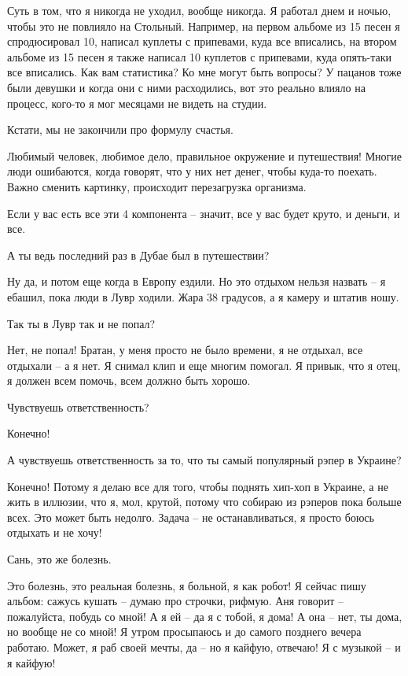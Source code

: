 Суть в том, что я никогда не уходил, вообще никогда. Я работал днем и ночью,
чтобы это не повлияло на Стольный. Например, на первом альбоме из 15 песен я
спродюсировал 10, написал куплеты с припевами, куда все вписались, на втором
альбоме из 15 песен я также написал 10 куплетов с припевами, куда опять-таки
все вписались. Как вам статистика? Ко мне могут быть вопросы? У пацанов тоже
были девушки и когда они с ними расходились, вот это реально влияло на процесс,
кого-то я мог месяцами не видеть на студии.

Кстати, мы не закончили про формулу счастья.

Любимый человек, любимое дело, правильное окружение и путешествия! Многие люди
ошибаются, когда говорят, что у них нет денег, чтобы куда-то поехать. Важно
сменить картинку, происходит перезагрузка организма.

Если у вас есть все эти 4 компонента – значит, все у вас будет круто, и деньги,
и все.

А ты ведь последний раз в Дубае был в путешествии?

Ну да, и потом еще когда в Европу ездили. Но это отдыхом нельзя назвать – я
ебашил, пока люди в Лувр ходили.  Жара 38 градусов, а я камеру и штатив ношу.

Так ты в Лувр так и не попал?

Нет, не попал! Братан, у меня просто не было времени, я не отдыхал, все
отдыхали –  а я нет. Я снимал клип и еще многим помогал. Я привык, что я отец,
я должен всем помочь, всем должно быть хорошо.

Чувствуешь ответственность?

Конечно!

А чувствуешь ответственность за то, что ты самый популярный рэпер в Украине?

Конечно! Потому я делаю все для того, чтобы поднять хип-хоп в Украине, а не
жить в иллюзии, что я, мол, крутой, потому что собираю из рэперов пока больше
всех. Это может быть недолго. Задача – не останавливаться, я просто боюсь
отдыхать и не хочу!

Сань, это же болезнь.

Это болезнь, это реальная болезнь, я больной, я как робот! Я сейчас пишу
альбом: сажусь кушать – думаю про строчки, рифмую. Аня говорит – пожалуйста,
побудь со мной! А я ей – да я с тобой, я дома! А она – нет, ты дома, но вообще
не со мной! Я утром просыпаюсь и до самого позднего вечера работаю. Может, я
раб своей мечты, да – но я кайфую, отвечаю! Я с музыкой – и я кайфую!

